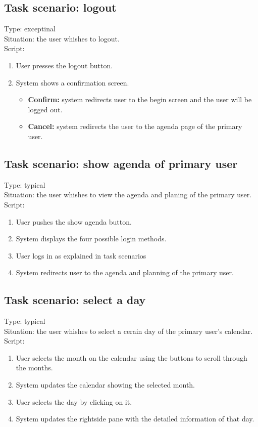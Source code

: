 \documentclass[11pt, a4paper,svglistings]{report}
\begin{document}
\subsection{Task scenario: logout}

Type: exceptinal \\
Situation: the user whishes to logout. \\
Script:
\begin{enumerate}
\item User presses the logout button.
\item System shows a confirmation screen.
\begin{itemize}
\item \textbf{Confirm:} system redirects user to the begin screen and the user will be logged out.
\item \textbf{Cancel:} system redirects the user to the agenda page of the primary user.
\end{itemize}
\end{enumerate}


\subsection{Task scenario: show agenda of primary user}

\label{subsec:agenda}Type: typical \\
Situation: the user whishes to view  the agenda and planing of the primary user. \\
Script:
\begin{enumerate}
\item User pushes the show agenda button.
\item System displays the four possible login methods.
\item User logs in as explained in task scenarios%
\item System redirects user to the agenda and planning of the primary user.
\end{enumerate}


\subsection{Task scenario: select a day}

\label{subsec:day}Type: typical \\
Situation: the user whishes to select a cerain day  of the primary user's calendar. \\
Script:
\begin{enumerate}
\item User selects the month on the calendar using the buttons to scroll through the months.
\item System updates the calendar showing the selected month.
\item User selects the day by clicking on it.
\item System updates the rightside pane with the detailed information of that day.
\end{enumerate}
\end{document}
